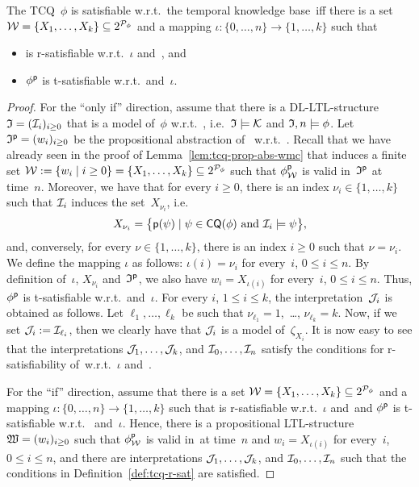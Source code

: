 \begin{lemma}\label{lem:tcq-r-sat-t-sat}
    The TCQ~$\phi$ is satisfiable w.r.t.\ the temporal knowledge base~\Kmc iff
    there is a set $\mathcal{W}=\{X_1,\dots,X_k\}\subseteq 2^{\mathcal{P}_\phi}$ and a mapping
    $\iota\colon\{0,\dots,n\}\to\{1,\dots,k\}$ such that
    \begin{itemize}
        \item \Wmc is r-satisfiable w.r.t.~$\iota$ and~\Kmc, and
        \item $\phi^\mathsf{p}$ is t-satisfiable w.r.t.~\Wmc and~$\iota$.
    \end{itemize}
\end{lemma}

\begin{proof}
    For the \enquote{only if} direction, assume that there is a DL-LTL-structure
    $\mathfrak{I}=(\mathcal{I}_i)_{i\ge 0}$ that is a model of~$\phi$ w.r.t.~\Kmc,
    i.e.~$\mathfrak{I}\models\mathcal{K}$ and $\mathfrak{I},n\models\phi$.
    Let $\mathfrak{I}^\mathsf{p}=(w_i)_{i\ge 0}$ be the propositional abstraction of~\Imf
    w.r.t.~\psf.
    Recall that we have already seen in the proof of
    Lemma~\ref{lem:tcq-prop-abs-wmc} that \Imf induces a finite set
    $\mathcal{W}:=\{w_i\mid i\ge 0\}=\{X_1,\dots,X_k\}\subseteq 2^{\mathcal{P}_\phi}$ such
    that $\phi^\mathsf{p}_\mathcal{W}$ is valid in~$\mathfrak{I}^\mathsf{p}$ at time~$n$.
    Moreover, we have that for every $i\ge 0$, there is an index
    $\nu_i\in\{1,\dots,k\}$ such that $\mathcal{I}_i$ induces the set~$X_{\nu_i}$,
    i.e.\
    \[X_{\nu_i}=\bigl\{\psf(\psi)\mid\psi\in\CQ(\phi)\ \text{and}\
        \Imc_i\models\psi\bigr\},\]
    and, conversely, for every $\nu\in\{1,\dots,k\}$, there is an index $i\ge 0$
    such that $\nu=\nu_i$.
    We define the mapping $\iota$ as follows: $\iota(i)=\nu_i$ for every~$i$,
    $0\le i\le n$.
    By definition of~$\iota$, $X_{\nu_i}$ and~$\mathfrak{I}^\mathsf{p}$, we also have
    $w_i=X_{\iota(i)}$ for every~$i$, $0\le i\le n$.
    Thus, $\phi^\mathsf{p}$ is t-satisfiable w.r.t.~\Wmc and~$\iota$.
    For every $i$, $1\le i\le k$, the interpretation~$\mathcal{J}_i$ is obtained as
    follows.  Let $\ell_1,\dots,\ell_k$ be such that $\nu_{\ell_1}=1$,~\dots,
    $\nu_{\ell_k}=k$.  Now, if we set $\mathcal{J}_i:=\mathcal{I}_{\ell_i}$, then we clearly
    have that $\mathcal{J}_i$ is a model of~$\zeta_{X_i}$.  It is now easy to see that
    the interpretations $\mathcal{J}_1,\dots,\mathcal{J}_k$, and $\mathcal{I}_0,\dots,\mathcal{I}_n$ satisfy
    the conditions for r-satisfiability of~\Wmc w.r.t.~$\iota$ and~\Kmc.

    For the \enquote{if} direction, assume that there is a set
    $\mathcal{W}=\{X_1,\dots,X_k\}\subseteq 2^{\mathcal{P}_\phi}$ and a mapping
    $\iota\colon\{0,\dots,n\}\to\{1,\dots,k\}$ such that \Wmc is r-satisfiable
    w.r.t.~$\iota$ and~\Kmc and $\phi^\mathsf{p}$ is t-satisfiable w.r.t.~\Wmc
    and~$\iota$.  Hence, there is a propositional LTL-structure
    $\mathfrak{W}=(w_i)_{i\ge 0}$ such that $\phi^\mathsf{p}_\mathcal{W}$ is valid in~\Wmf at
    time~$n$ and $w_i=X_{\iota(i)}$ for every~$i$, $0\le i\le n$, and there are
    interpretations $\mathcal{J}_1,\dots,\mathcal{J}_k$, and $\mathcal{I}_0,\dots,\mathcal{I}_n$ such that
    the conditions in Definition~\ref{def:tcq-r-sat} are satisfied.


\end{proof}
